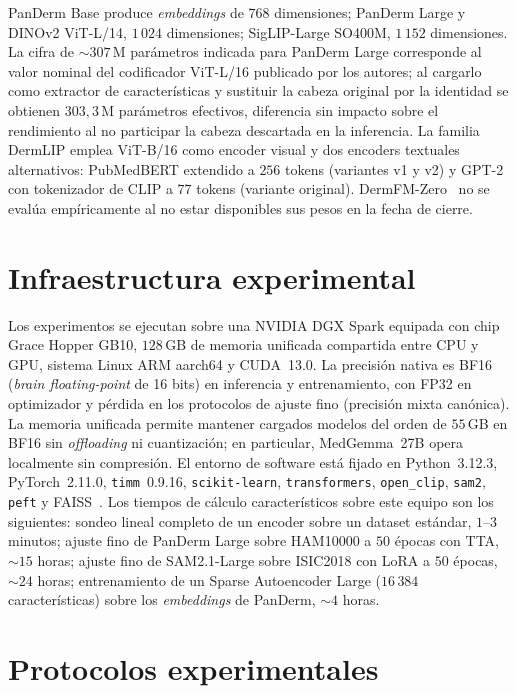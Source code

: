 PanDerm Base produce \emph{embeddings} de $768$ dimensiones;
PanDerm Large y DINOv2 ViT-L/14, $1\,024$ dimensiones; SigLIP-Large
SO400M, $1\,152$ dimensiones. La cifra de $\sim 307$\,M parámetros
indicada para PanDerm Large corresponde al valor nominal del
codificador ViT-L/16 publicado por los autores; al cargarlo como
extractor de características y sustituir la cabeza original por la
identidad se obtienen $303{,}3$\,M parámetros efectivos, diferencia
sin impacto sobre el rendimiento al no participar la cabeza
descartada en la inferencia. La familia DermLIP emplea ViT-B/16
como encoder visual y dos encoders textuales alternativos:
PubMedBERT extendido a $256$ tokens (variantes v1 y v2) y GPT-2
con tokenizador de CLIP a $77$ tokens (variante original).
DermFM-Zero~\cite{dermfmzero2026} no se evalúa empíricamente al no
estar disponibles sus pesos en la fecha de cierre.

\section{Infraestructura experimental}
\label{sec:infraestructura}

Los experimentos se ejecutan sobre una NVIDIA DGX Spark equipada
con chip Grace Hopper GB10, $128$\,GB de memoria unificada
compartida entre CPU y GPU, sistema Linux ARM aarch64 y CUDA~13.0.
La precisión nativa es BF16 (\emph{brain floating-point} de 16
bits) en inferencia y entrenamiento, con FP32 en optimizador y
pérdida en los protocolos de ajuste fino (precisión mixta
canónica). La memoria unificada permite mantener cargados modelos
del orden de $55$\,GB en BF16 sin \emph{offloading} ni
cuantización; en particular, MedGemma~27B opera localmente sin
compresión. El entorno de software está fijado en Python~3.12.3,
PyTorch~2.11.0, \texttt{timm}~0.9.16, \texttt{scikit-learn},
\texttt{transformers}, \texttt{open\_clip}, \texttt{sam2},
\texttt{peft} y FAISS~\cite{faiss2019}. Los tiempos de cálculo
característicos sobre este equipo son los siguientes: sondeo lineal
completo de un encoder sobre un dataset estándar, $1$--$3$
minutos; ajuste fino de PanDerm Large sobre HAM10000 a $50$
épocas con TTA, $\sim 15$ horas; ajuste fino de SAM2.1-Large
sobre ISIC2018 con LoRA a $50$ épocas, $\sim 24$ horas;
entrenamiento de un Sparse Autoencoder Large ($16\,384$
características) sobre los \emph{embeddings} de PanDerm,
$\sim 4$ horas.

\section{Protocolos experimentales}
\label{sec:protocolos}

